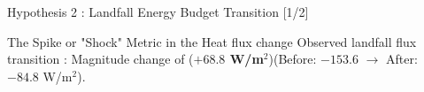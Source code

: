 \documentclass[8pt, aspectratio=169]{beamer}
\begin{document}
\begin{frame}{Hypothesis 2 : Landfall Energy Budget Transition [1/2]}
    \vspace{0.2cm}
    \begin{exampleblock}{\footnotesize The Spike or "Shock" Metric in the Heat flux change}
        \footnotesize Observed landfall flux transition : Magnitude change of (\textbf{$+68.8$ W/m$^2$})\footnotemark[6] (Before: $-153.6$ $\rightarrow$ After: $-84.8$ W/m$^2$).
    \end{exampleblock}

\end{frame}
\end{document}
